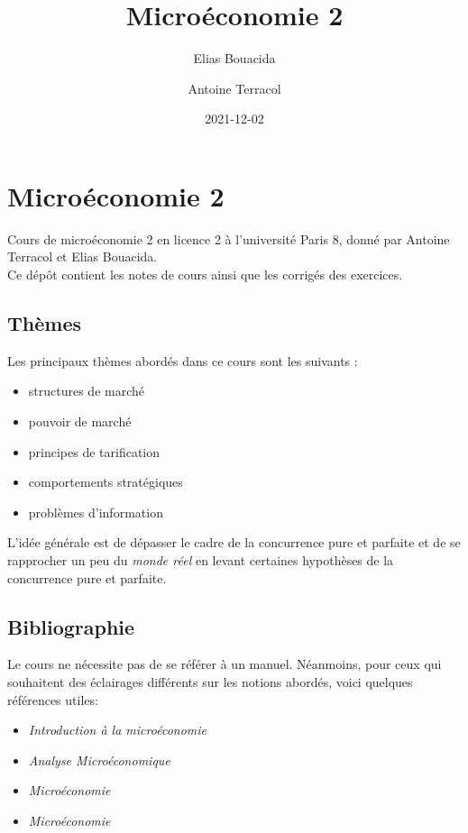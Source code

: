 \documentclass[
]{book}
\title{Microéconomie 2}
\author{Elias Bouacida \and Antoine Terracol}
\date{2021-12-02}
\providecommand{\tightlist}{%
  \setlength{\itemsep}{0pt}\setlength{\parskip}{0pt}}
\theoremstyle{definition}
\theoremstyle{definition}
\theoremstyle{definition}
\theoremstyle{definition}
\theoremstyle{remark}
\begin{document}
\maketitle

{
\setcounter{tocdepth}{1}
\tableofcontents
}
\hypertarget{microuxe9conomie-2}{%
\chapter{Microéconomie 2}\label{microuxe9conomie-2}}

Cours de microéconomie 2 en licence 2 à l'université Paris 8, donné par Antoine Terracol et Elias Bouacida.\\
Ce dépôt contient les notes de cours ainsi que les corrigés des exercices.

\hypertarget{thuxe8mes}{%
\section{Thèmes}\label{thuxe8mes}}

Les principaux thèmes abordés dans ce cours sont les suivants :

\begin{itemize}
\tightlist
\item
  structures de marché
\item
  pouvoir de marché
\item
  principes de tarification
\item
  comportements stratégiques
\item
  problèmes d'information
\end{itemize}

L'idée générale est de dépasser le cadre de la concurrence pure et parfaite et de se rapprocher un peu du \emph{monde réel} en levant certaines hypothèses de la concurrence pure et parfaite.

\hypertarget{bibliographie}{%
\section{Bibliographie}\label{bibliographie}}

Le cours ne nécessite pas de se référer à un manuel.
Néanmoins, pour ceux qui souhaitent des éclairages différents sur les notions abordés, voici quelques références utiles:

\begin{itemize}
\tightlist
\item
  \citet{varian2015} \emph{Introduction à la microéconomie}
\item
  \citet{varian2008} \emph{Analyse Microéconomique}
\item
  \citet{pindyck2012} \emph{Microéconomie}
\item
  \citet{jeleva2014} \emph{Microéconomie}
\end{itemize}
\end{document}
